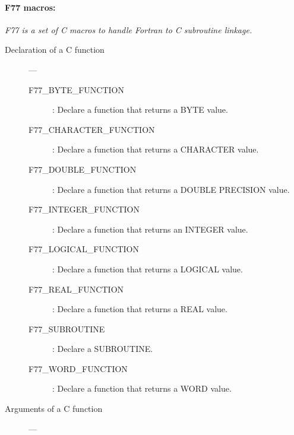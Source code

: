\newpage

\paragraph{F77 macros:}\hfill

{\em F77 is a set of C macros to handle Fortran to C subroutine linkage.}

\begin{description}

\item [Declaration of a C function] ---

\begin{description}
\item [F77\_BYTE\_FUNCTION] : Declare a function that returns a BYTE value.
\item [F77\_CHARACTER\_FUNCTION] : Declare a function that returns a CHARACTER value.
\item [F77\_DOUBLE\_FUNCTION] : Declare a function that returns a DOUBLE PRECISION value.
\item [F77\_INTEGER\_FUNCTION] : Declare a function that returns an INTEGER value.
\item [F77\_LOGICAL\_FUNCTION] : Declare a function that returns a LOGICAL value.
\item [F77\_REAL\_FUNCTION] : Declare a function that returns a REAL value.
\item [F77\_SUBROUTINE] : Declare a SUBROUTINE.
\item [F77\_WORD\_FUNCTION] : Declare a function that returns a WORD value.
\end{description}

\item [Arguments of a C function] ---


\end{description}
